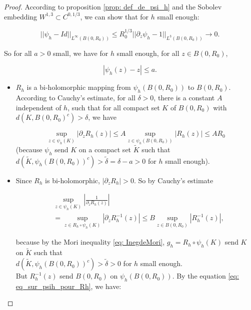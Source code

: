 \documentclass[leqno,11pt,letterpaper, english]{amsart}
\newcommand{\nn}{\nonumber}
\theoremstyle{plain}
\theoremstyle{definition}
\numberwithin{equation}{section}
\begin{document}
	\begin{proof}
		
		
		According to proposition \ref{prop: def_de_psi_h} and the Sobolev embedding  $W^{1,3}\subset C^{0,1/3}$, we can show that for $h$ small enough:
		
		\begin{equation}
			||\psi_h- Id||_{L^\infty(B(0,R_0))}\leq R_0^{1/3}||\partial_z\psi_h-1||_{L^3(B(0,R_0))}\longrightarrow 0.
		\end{equation}
		
		So for all $a>0$ small, we have for $h$ small enough, for all $z\in B(0,R_0)$,
		
		\begin{equation}
			\label{eq: eq_sur_psih_pour_Rh}
			|\psi_h(z)-z|\leq a.
		\end{equation} 
		
		\begin{itemize}
			
			\item $R_h$ is a bi-holomorphic mapping from $\psi_h(B(0,R_0))$ to $B(0,R_0)$. According to Cauchy's estimate, for all $\delta>0$, there is a constant $A$ independent of $h$, such that for all compact set $K$ of $B(0,R_0)$ with $d(K, B(0,R_0)^c)>\delta$, we have
			
			\begin{equation}
				\sup_{z\in \psi_h(K)}|\partial_z R_h(z)| \leq A \sup_{z\in \psi_h(B(0,R_0))}|R_h(z)|\leq A R_0
			\end{equation}
			(because $\psi_h$ send $K$ on a compact set $\tilde{K}$ such that  $d(\tilde{K}, \psi_h(B(0,R_0))^c)>\tilde{\delta}=\delta-a>0$ for $h$ small enough).
			
			
			\item Since $R_h$ is bi-holomorphic, $|\partial_z R_h|>0$. So by Cauchy's estimate
			
			\begin{align}
				&\sup_{z\in \psi_h(K)}\left|\frac{1}{\partial_z R_h(z)}\right|\nn\\
				&= \sup_{z\in R_h\circ\psi_h(K)}|\partial_z R_h^{-1}(z)|\leq B \sup_{z\in B(0,R_0)} | R_h^{-1}(z)|,
			\end{align}
			
			because by the Mori inequality \ref{eq: InegdeMori}, $g_h=R_h\circ\psi_h(K)$ send $K$ on $\tilde{K}$ such that\\ $d(\tilde{K}, \psi_h(B(0,R_0))^c)>\tilde{\delta}>0$ for $h$ small enough.\\
			But $ R_h^{-1}(z)$ send $B(0,R_0)$ on $\psi_h(B(0,R_0))$. By the equation \ref{eq: eq_sur_psih_pour_Rh}, we have:
			

\end{itemize}
\end{proof}
\end{document}
